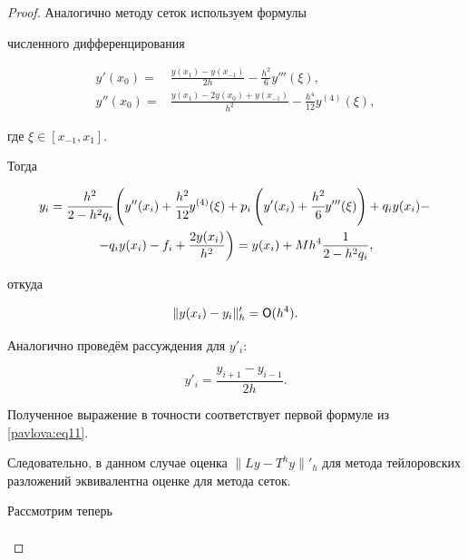 \begin{proof}
Аналогично методу сеток \cite{pavlova:bib3} используем формулы

численного дифференцирования

\begin{equation}

\label{pavlova:eq11}

\begin{aligned}

y'(x_0)=&\frac{y(x_1)-y(x_{-1})}{2h}-\frac{h^2}{6}y'''(\xi ), \\

y''(x_0)=&\frac{y(x_1)-2y(x_0)+y(x_{-1})}{h^2}-\frac{h^4}{12}y^{(4)}(\xi),

\end{aligned}

\end{equation}

где $\xi \in [x_{-1},x_1] $.

Тогда

\begin{multline*}

y_i =\cfrac{h^2}{2-h^2q_i}

\left(y''(x_i)+\cfrac{h^2}{12}y^{(4)}(\xi) + p_i \left(y'(x_i)+\cfrac{h^2}{6}y'''(\xi) \right)+

q_i y(x_i) - \right.\\

\left.-q_i y(x_i) - f_i + \frac{2y(x_i)}{h^2}\right)= y(x_i) +

Mh^4 \frac{1}{2-h^2q_i},

\end{multline*}

откуда

$$

\|y(x_i)-y_i \|'_h={\sf O}(h^4).

$$



Аналогично проведём рассуждения для $y'_i$:

\[

y'_i =\frac{y_{i+1}-y_{i-1}}{2h}.

\]

Полученное выражение в точности соответствует первой формуле из \eqref{pavlova:eq11}.

Следовательно, в данном случае оценка $\| Ly-T^hy\|'_h$ для метода тейлоровских разложений эквивалентна оценке для метода сеток.



Рассмотрим теперь

\begin{multline*}


\end{multline*}
\end{proof}
